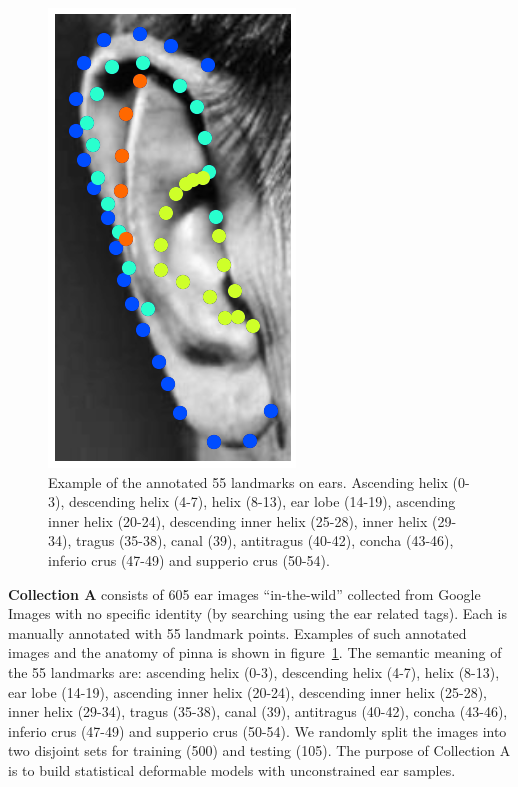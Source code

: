 \begin{figure}[!b]
    \includegraphics[height=\flowhhh]{resources/Ear_Deformable_Model/dbs/db_12}
    \caption{Example of the annotated 55 landmarks on ears. Ascending helix (0-3), descending helix (4-7), helix (8-13), ear lobe (14-19), ascending inner helix (20-24), descending inner helix (25-28), inner helix (29-34), tragus (35-38), canal (39), antitragus (40-42), concha (43-46), inferio crus (47-49) and supperio crus (50-54).}
    \label{fig:db_example}
\end{figure}


\textbf{Collection A} consists of 605 ear images ``in-the-wild'' collected from Google Images with no specific identity (by searching using the ear related tags). Each is manually annotated with 55 landmark points. Examples of such annotated images and the anatomy of pinna is shown in figure~\ref{fig:db_example}. The semantic meaning of the 55 landmarks are: ascending helix (0-3), descending helix (4-7), helix (8-13), ear lobe (14-19), ascending inner helix (20-24), descending inner helix (25-28), inner helix (29-34), tragus (35-38), canal (39), antitragus (40-42), concha (43-46), inferio crus (47-49) and supperio crus (50-54). We randomly split the images into two disjoint sets for training (500) and testing (105). The purpose of Collection A is to build statistical deformable models with unconstrained ear samples.


